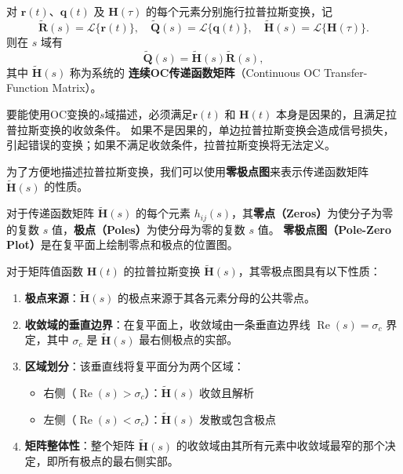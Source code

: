 \begin{theorem}
    对 $\mathbf{r}(t)$、$\mathbf{q}(t)$ 及 $\mathbf{H}(\tau)$ 的每个元素分别施行拉普拉斯变换，记
    \begin{equation}
        \tilde{\mathbf{R}}(s)=\mathcal{L}\{\mathbf{r}(t)\},\quad
        \tilde{\mathbf{Q}}(s)=\mathcal{L}\{\mathbf{q}(t)\},\quad
        \tilde{\mathbf{H}}(s)=\mathcal{L}\{\mathbf{H}(\tau)\}.
    \end{equation}
    则在 $s$ 域有
    \begin{equation}
        \tilde{\mathbf{Q}}(s)=\tilde{\mathbf{H}}(s)\tilde{\mathbf{R}}(s),
    \end{equation}
    其中 $\tilde{\mathbf{H}}(s)$ 称为系统的 \textbf{连续OC传递函数矩阵}（Continuous OC Transfer-Function Matrix）。
\end{theorem}

\begin{remark}
    要能使用OC变换的$s$域描述，必须满足\(\mathbf{r}(t)\) 和 \(\mathbf{H}(t)\) 本身是因果的，且满足拉普拉斯变换的收敛条件。
    如果不是因果的，单边拉普拉斯变换会造成信号损失，引起错误的变换；如果不满足收敛条件，拉普拉斯变换将无法定义。
\end{remark}

为了方便地描述拉普拉斯变换，我们可以使用\textbf{零极点图}来表示传递函数矩阵 $\tilde{\mathbf{H}}(s)$ 的性质。
\begin{definition}[零极点图]
    对于传递函数矩阵 $\tilde{\mathbf{H}}(s)$ 的每个元素 $h_{ij}(s)$，其\textbf{零点（Zeros）}为使分子为零的复数 $s$ 值，\textbf{极点（Poles）}为使分母为零的复数 $s$ 值。
    \textbf{零极点图（Pole-Zero Plot）}是在复平面上绘制零点和极点的位置图。
\end{definition}
\begin{remark}
    对于矩阵值函数 $\mathbf{H}(t)$ 的拉普拉斯变换 $\tilde{\mathbf{H}}(s)$，其零极点图具有以下性质：

    \begin{enumerate}
        \item \textbf{极点来源}：$\tilde{\mathbf{H}}(s)$ 的极点来源于其各元素分母的公共零点。

        \item \textbf{收敛域的垂直边界}：在复平面上，收敛域由一条垂直边界线 $\operatorname{Re}(s) = \sigma_c$ 界定，其中 $\sigma_c$ 是 $\tilde{\mathbf{H}}(s)$ 最右侧极点的实部。

        \item \textbf{区域划分}：该垂直线将复平面分为两个区域：
              \begin{itemize}
                  \item 右侧（$\operatorname{Re}(s) > \sigma_c$）：$\tilde{\mathbf{H}}(s)$ 收敛且解析
                  \item 左侧（$\operatorname{Re}(s) < \sigma_c$）：$\tilde{\mathbf{H}}(s)$ 发散或包含极点
              \end{itemize}

        \item \textbf{矩阵整体性}：整个矩阵 $\tilde{\mathbf{H}}(s)$ 的收敛域由其所有元素中收敛域最窄的那个决定，即所有极点的最右侧实部。
    \end{enumerate}
\end{remark}

